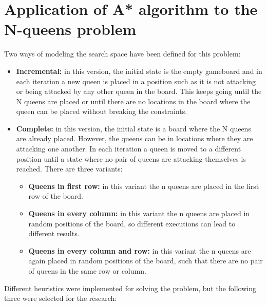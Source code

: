 \documentclass[]{llncs}
\begin{document}
\section{Application of A* algorithm to the N-queens problem}\label{astar_nqueens}
Two ways of modeling the search space have been defined for this problem:
\begin{itemize}
    \item \textbf{Incremental:} in this version, the initial state is the empty gameboard and in each iteration a new queen is placed in a position such as it is not attacking or being attacked by any other queen in the board. This keeps going until the N queens are placed or until there are no locations in the board where the queen can be placed without breaking the constraints.
    \item \textbf{Complete:} in this version, the initial state is a board where the N queens are already placed. However, the queens can be in locations where they are attacking one another. In each iteration a queen is moved to a different position until a state where no pair of queens are attacking themselves is reached. There are three variants:
    \begin{itemize}
        \item \textbf{Queens in first row:} in this variant the n queens are placed in the first row of the board.
        \item \textbf{Queens in every column:} in this variant the n queens are placed in random positions of the board, so different executions can lead to different results.
        \item \textbf{Queens in every column and row:} in this variant the n queens are again placed in random positions of the board, such that there are no pair of queens in the same row or column.
    \end{itemize}
\end{itemize}
Different heuristics were implemented for solving the problem, but the following three were selected for the research:
\end{document}

